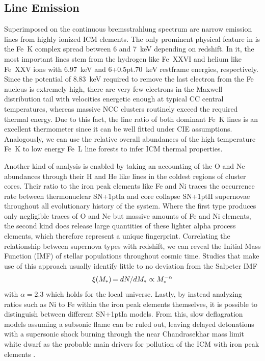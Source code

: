\subsection{Line Emission}

Superimposed on the continuous bremsstrahlung spectrum are narrow emission lines from highly ionized
ICM elements. The only prominent physical feature in  is the Fe~K complex
spread between 6 and \qty{7}{\kilo\electronvolt} depending on redshift. In it, the most important lines
stem from the hydrogen like Fe~XXVI and helium like Fe~XXV ions with \qty{6.97}{\kilo\electronvolt} and
{6\kern+0.5pt.\kern-0.5pt}\qty{70}{\kilo\electronvolt} restframe energies, respectively. Since the potential of \qty{8.83}{\kilo\electronvolt}
required to remove the last electron from the Fe nucleus is extremely high, there are very few electrons in the Maxwell
distribution tail with velocities energetic enough at typical CC central temperatures, whereas massive NCC clusters
routinely exceed the required thermal energy. Due to this fact, the line ratio of both dominant Fe~K lines is an
excellent thermometer since it can be well fitted under CIE assumptions. Analogously, we can use the relative overall
abundances of the high temperature Fe~K to low energy Fe~L line forests to infer ICM thermal properties. 

Another kind of analysis is enabled by taking an accounting of the O and Ne abundances through their H and He like lines
in the coldest regions of cluster cores. Their ratio to the iron peak elements like Fe and Ni traces the occurrence rate
between thermonuclear SN{\kern+1pt}Ia and core collapse SN{\kern+1pt}II supernovae throughout all evolutionary history
of the system. Where the first type produces only negligible traces of O and Ne but massive amounts of Fe and Ni elements,
the second kind does release large quantities of these lighter alpha process elements, which therefore represent a unique fingerprint.
Correlating the relationship between supernova types with redshift, we can reveal the Initial Mass Function (IMF) of stellar populations
throughout cosmic time. Studies that make use of this approach usually identify little to no deviation from the Salpeter IMF
\begin{equation*}
	\xi(M_*) \kern-1pt = dN\kern-1pt/dM_* \propto M_*^{-\alpha}
\end{equation*}
with $\alpha = 2.3$ which holds for the local universe. Lastly, by instead analyzing ratios such as Ni to Fe within the iron peak
elements themselves, it is possible to distinguish between different SN{\kern+1pt}Ia models. From this, slow deflagration models assuming
a subsonic flame can be ruled out, leaving delayed detonations with a supersonic shock burning through the near Chandrasekhar mass limit
white dwarf as the probable main drivers for pollution of the ICM with iron peak elements \cite{boeh2010}.
